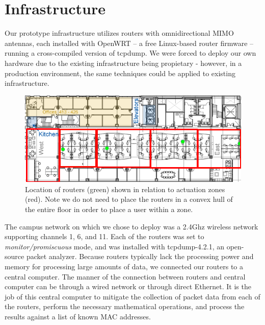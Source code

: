 \section{Infrastructure}
Our prototype infrastructure utilizes routers with omnidirectional MIMO antennas, each installed with OpenWRT -- a free Linux-based router firmware -- running a cross-compiled version of tcpdump. We were forced to deploy our own hardware due to the existing infrastructure being propietary - however, in a production environment, the same techniques could be applied to existing infrastructure.
\begin{figure}[htb]
\begin{center}
\includegraphics[width=\linewidth]{figs/floor4}
\end{center}
\caption{Location of routers (green) shown in relation to actuation zones (red). Note we do not need to place the routers in a convex hull of the entire floor in order to place a user within a zone.}
\end{figure}

The campus network on which we chose to deploy was a 2.4Ghz wireless network supporting channels 1, 6, and 11. Each of the routers was set to \emph{monitor/promiscuous} mode, and was installed with tcpdump-4.2.1, an open-source packet analyzer. Because routers typically lack the processing power and memory for processing large amounts of data, we connected our routers to a central computer. The manner of the connection between routers and central computer can be through a wired network or through direct Ethernet. It is the job of this central computer to mitigate the collection of packet data from each of the routers, perform the necessary mathematical operations, and process the results against a list of known MAC addresses. 

